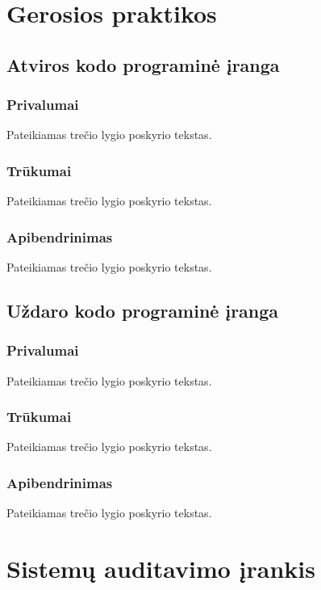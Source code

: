 \documentclass[a4paper,12pt,fleqn]{article}
\begin{document}
\newpage
\section{Gerosios praktikos}
\label{sec:motivation}

\subsection{Atviros kodo programinė įranga}
\label{sec:example}

\subsubsection{Privalumai}
\label{sec:data}
Pateikiamas trečio lygio poskyrio tekstas.

\subsubsection{Trūkumai}
\label{sec:data}
Pateikiamas trečio lygio poskyrio tekstas.

\subsubsection{Apibendrinimas}
\label{sec:data}
Pateikiamas trečio lygio poskyrio tekstas.

\subsection{Uždaro kodo programinė įranga}
\label{sec:example}

\subsubsection{Privalumai}
\label{sec:data}
Pateikiamas trečio lygio poskyrio tekstas.

\subsubsection{Trūkumai}
\label{sec:data}
Pateikiamas trečio lygio poskyrio tekstas.

\subsubsection{Apibendrinimas}
\label{sec:data}
Pateikiamas trečio lygio poskyrio tekstas.

\newpage
\section{Sistemų auditavimo įrankis}
\label{sec:motivation}
\end{document}
